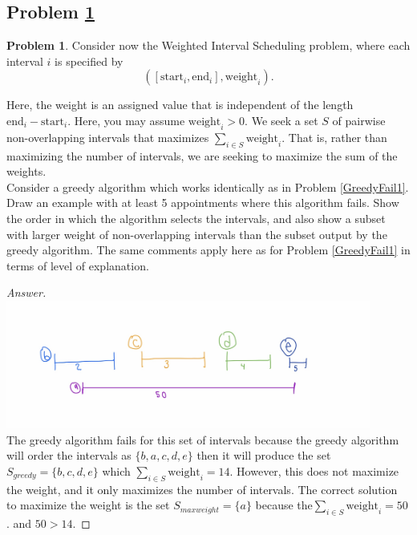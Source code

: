 \documentclass[11pt]{article}
\theoremstyle{definition}
\theoremstyle{definition}
\newtheorem{required}{Problem}
\theoremstyle{definition}
\begin{document}
\newpage
\subsection{Problem \ref{GreedyFail3}}
\begin{required} \label{GreedyFail3}
Consider now the \textsf{Weighted Interval Scheduling} problem, where each interval $i$ is specified by 
\[
([\text{start}_{i}, \text{end}_{i}], \text{weight}_{i}). 
\]

\noindent Here, the weight is an assigned value that is independent of the length $\text{end}_{i} - \text{start}_{i}$. Here, you may assume $\text{weight}_{i} > 0$. We seek a set $S$ of pairwise non-overlapping intervals that maximizes $\sum_{i \in S} \text{weight}_{i}$. That is, rather than maximizing the number of intervals, we are seeking to maximize the sum of the weights. \\

\noindent Consider a greedy algorithm which works identically as in Problem \ref{GreedyFail1}. Draw an example with at least 5 appointments where this algorithm fails. Show the order in which the algorithm selects the intervals, and also show a subset with larger weight of non-overlapping intervals than the subset output by the greedy algorithm. The same comments apply here as for Problem \ref{GreedyFail1} in terms of level of explanation.
\end{required}

\begin{proof}[Answer]

\includegraphics[width=0.9\textwidth]{problem6} \\
The greedy algorithm fails for this set of intervals because the greedy algorithm will order the intervals as $\{b, a, c, d, e\}$ then it will produce the set $S_{greedy} = \{b, c, d, e\}$ which $\sum_{i \in S} \text{weight}_{i}= 14$. However, this does not maximize the weight, and it only maximizes the number of intervals. The correct solution to maximize the weight is the set $S_{max weight} = \{a\}$ because the$\sum_{i \in S} \text{weight}_{i}= 50$. and $50 > 14$.  
\end{proof}
\end{document}
